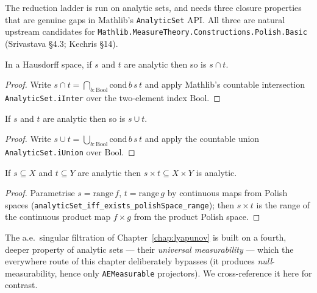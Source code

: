 The reduction ladder is run on analytic sets, and needs three closure properties that are genuine
gaps in Mathlib's \texttt{AnalyticSet} API. All three are natural upstream candidates for
\texttt{Mathlib.MeasureTheory.Constructions.Polish.Basic} (Srivastava \S4.3; Kechris \S14).

\begin{lemma}\label{thm:dst-inter}
  \leanok
  In a Hausdorff space, if \(s\) and \(t\) are analytic then so is \(s\cap t\).
\end{lemma}
\begin{proof}\leanok
  Write \(s\cap t=\bigcap_{b:\mathrm{Bool}}\mathrm{cond}\,b\,s\,t\) and apply Mathlib's countable
  intersection \texttt{AnalyticSet.iInter} over the two-element index \(\mathrm{Bool}\).
\end{proof}

\begin{lemma}\label{thm:dst-union}
  \leanok
  If \(s\) and \(t\) are analytic then so is \(s\cup t\).
\end{lemma}
\begin{proof}\leanok
  Write \(s\cup t=\bigcup_{b:\mathrm{Bool}}\mathrm{cond}\,b\,s\,t\) and apply the countable union
  \texttt{AnalyticSet.iUnion} over \(\mathrm{Bool}\).
\end{proof}

\begin{lemma}\label{thm:dst-prod}
  \leanok
  If \(s\subseteq X\) and \(t\subseteq Y\) are analytic then \(s\times t\subseteq X\times Y\) is
  analytic.
\end{lemma}
\begin{proof}\leanok
  Parametrise \(s=\mathrm{range}\,f\), \(t=\mathrm{range}\,g\) by continuous maps from Polish
  spaces (\texttt{analyticSet\_iff\_exists\_polishSpace\_range}); then \(s\times t\) is the range of
  the continuous product map \(f\times g\) from the product Polish space.
\end{proof}

The a.e.\ singular filtration of Chapter~\ref{chap:lyapunov} is built on a fourth, deeper property
of analytic sets --- their \emph{universal measurability} --- which the everywhere route of this
chapter deliberately bypasses (it produces \emph{null}-measurability, hence only \texttt{AEMeasurable}
projectors). We cross-reference it here for contrast.

